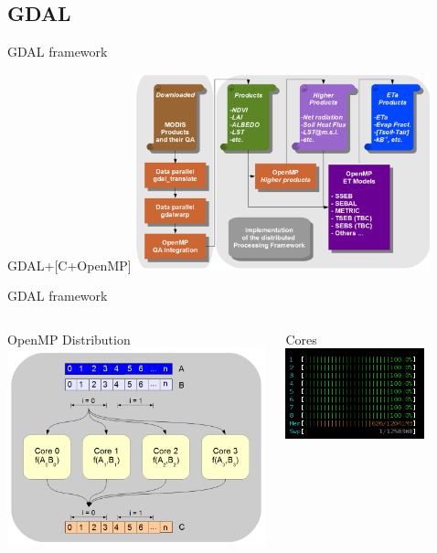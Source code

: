 \documentclass[xcolor=dvipsnames,beamer]{beamer} %
\begin{document}
\subsection{GDAL}
\begin{frame}[fragile]{GDAL framework}

\begin{center}
 GDAL+[C+OpenMP]
 \includegraphics[width=8.5cm]{chain2}
\end{center}
\end{frame}

\begin{frame}[fragile]{GDAL framework}

\begin{columns}[l]
\begin{center}
 OpenMP Distribution \\
 \includegraphics[width=7.5cm]{chain1}
\end{center}
\begin{center}
 Cores \\
 \includegraphics[width=4cm]{cores}
\end{center}
\end{columns}
\end{frame}
\end{document}
